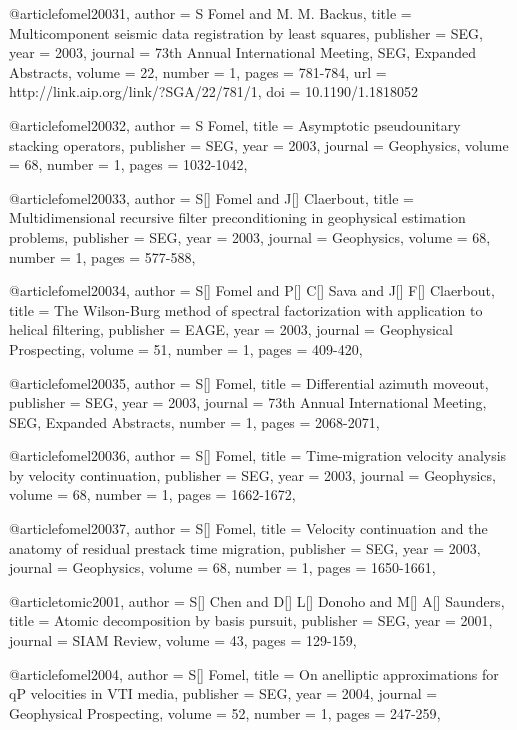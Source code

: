 @article{fomel20031,
  author =	 {S Fomel and M. M. Backus},
  title =	 {Multicomponent seismic data registration by least
                  squares},
  publisher =	 {SEG},
  year =	 2003,
  journal =	 {73th Annual International Meeting, SEG, Expanded Abstracts},
  volume =	 22,
  number =	 1,
  pages =	 {781-784},
  url =		 {http://link.aip.org/link/?SGA/22/781/1},
  doi =		 {10.1190/1.1818052}
}

@article{fomel20032,
  author =	 {S Fomel},
  title =	 {Asymptotic pseudounitary stacking operators},
  publisher =	 {SEG},
  year =	 2003,
  journal =	 {Geophysics},
  volume =	 68,
  number =	 1,
  pages =	 {1032-1042},
}

@article{fomel20033,
  author =	 {S[] Fomel and J[] Claerbout},
  title =	 {Multidimensional recursive filter preconditioning in geophysical estimation problems},
  publisher =	 {SEG},
  year =	 2003,
  journal =	 {Geophysics},
  volume =	 68,
  number =	 1,
  pages =	 {577-588},
}

@article{fomel20034,
  author =	 {S[] Fomel and P[] C[] Sava and J[] F[] Claerbout},
  title =	 {The Wilson-Burg method of spectral factorization with application to helical filtering},
  publisher =	 {EAGE},
  year =	 2003,
  journal =	 {Geophysical Prospecting},
  volume =	 51,
  number =	 1,
  pages =	 {409-420},
}

@article{fomel20035,
  author =	 {S[] Fomel},
  title =	 {Differential azimuth moveout},
  publisher =	 {SEG},
  year =	 2003,
  journal =	 {73th Annual International Meeting, SEG, Expanded Abstracts},
  number =	 1,
  pages =	 {2068-2071},
}

@article{fomel20036,
  author =	 {S[] Fomel},
  title =	 {Time-migration velocity analysis by velocity continuation},
  publisher =	 {SEG},
  year =	 2003,
  journal =	 {Geophysics},
  volume =	 68,
  number =	 1,
  pages =	 {1662-1672},
}

@article{fomel20037,
  author =	 {S[] Fomel},
  title =	 {Velocity continuation and the anatomy of residual prestack time migration},
  publisher =	 {SEG},
  year =	 2003,
  journal =	 {Geophysics},
  volume =	 68,
  number =	 1,
  pages =	 {1650-1661},
}

@article{tomic2001,
  author =	 {S[] Chen and D[] L[] Donoho and M[] A[] Saunders},
  title =	 {Atomic decomposition by basis pursuit},
  publisher =	 {SEG},
  year =	 2001,
  journal =	 {SIAM Review},
  volume =	 43,
  pages =	 {129-159},
}

@article{fomel2004,
  author =	 {S[] Fomel},
  title =	 {On anelliptic approximations for qP velocities in VTI media},
  publisher =	 {SEG},
  year =	 2004,
  journal =	 {Geophysical Prospecting},
  volume =	 52,
  number =	 1,
  pages =	 {247-259},
}

